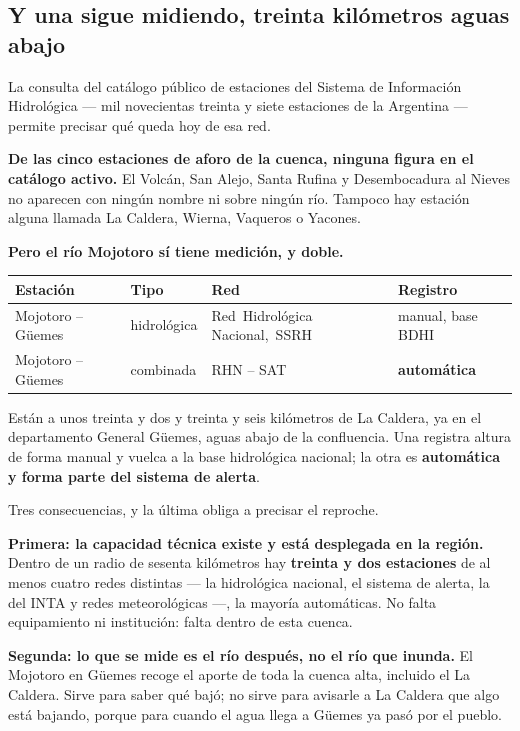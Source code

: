 \subsection*{Y una sigue midiendo, treinta kilómetros aguas abajo}

La consulta del catálogo público de estaciones del Sistema de Información Hidrológica ---
mil novecientas treinta y siete estaciones de la Argentina --- permite precisar qué queda hoy
de esa red.

\textbf{De las cinco estaciones de aforo de la cuenca, ninguna figura en el catálogo activo.}
El Volcán, San Alejo, Santa Rufina y Desembocadura al Nieves no aparecen con ningún nombre ni
sobre ningún río. Tampoco hay estación alguna llamada La Caldera, Wierna, Vaqueros o Yacones.

\textbf{Pero el río Mojotoro sí tiene medición, y doble.}

{\small
\begin{longtable}{@{}p{3.6cm}p{2.4cm}p{2.6cm}p{3.4cm}@{}}
\toprule
\textbf{Estación} & \textbf{Tipo} & \textbf{Red} & \textbf{Registro} \\
\midrule
\endhead
Mojotoro -- Güemes & hidrológica & \mbox{Red Hidrológica} \mbox{Nacional, SSRH} & manual, base BDHI \\
Mojotoro -- Güemes & combinada & RHN -- SAT & \textbf{automática} \\
\bottomrule
\end{longtable}
}

Están a unos treinta y dos y treinta y seis kilómetros de La Caldera, ya en el departamento
General Güemes, aguas abajo de la confluencia. Una registra altura de forma manual y vuelca a
la base hidrológica nacional; la otra es \textbf{automática y forma parte del sistema de
alerta}.

Tres consecuencias, y la última obliga a precisar el reproche.

\textbf{Primera: la capacidad técnica existe y está desplegada en la región.} Dentro de un
radio de sesenta kilómetros hay \textbf{treinta y dos estaciones} de al menos cuatro redes
distintas --- la hidrológica nacional, el sistema de alerta, la del INTA y redes
meteorológicas ---, la mayoría automáticas. No falta equipamiento ni institución: falta
dentro de esta cuenca.

\textbf{Segunda: lo que se mide es el río después, no el río que inunda.} El Mojotoro en
Güemes recoge el aporte de toda la cuenca alta, incluido el La Caldera. Sirve para saber qué
bajó; no sirve para avisarle a La Caldera que algo está bajando, porque para cuando el agua
llega a Güemes ya pasó por el pueblo.

